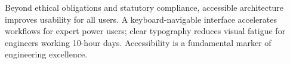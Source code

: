 Beyond ethical obligations and statutory compliance, accessible architecture improves usability for all users. A keyboard-navigable interface accelerates workflows for expert power users; clear typography reduces visual fatigue for engineers working 10-hour days. Accessibility is a fundamental marker of engineering excellence.
